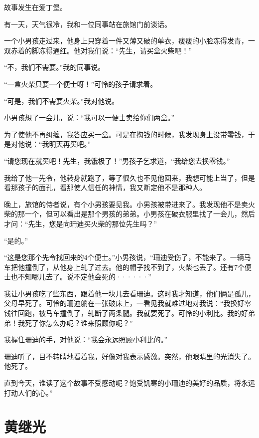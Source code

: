 \documentclass[12pt,UTF-8,openany]{ctexbook}
\begin{document}
\begin{large}
    
    故事发生在爱丁堡。
    
    有一天，天气很冷，我和一位同事站在旅馆门前谈话。
    
    一个小男孩走过来，他身上只穿着一件又薄又破的单衣，瘦瘦的小脸冻得发青，一双赤着的脚冻得通红。他对我们说：“先生，请买盒火柴吧！”
    
    “不，我们不需要。”我的同事说。
    
    “一盒火柴只要一个便士呀！”可怜的孩子请求着。
    
    “可是，我们不需要火柴。”我对他说。
    
    小男孩想了一会儿，说：“我可以一便士卖给你们两盒。”
    
    为了使他不再纠缠，我答应买一盒。可是在掏钱的时候，我发现身上没带零钱，于是对他说：“我明天再买吧。”
    
    “请您现在就买吧！先生，我饿极了！”男孩子乞求道，“我给您去换零钱。”
    
    我给了他一先令，他转身就跑了，等了很久也不见他回来，我想可能上当了，但是看那孩子的面孔，看那使人信任的神情，我又断定他不是那种人。
    
    晚上，旅馆的侍者说，有个小男孩要见我。小男孩被带进来了。我发现他不是卖火柴的那一个，但可以看出是那个男孩的弟弟。小男孩在破衣服里找了一会儿，然后才问：“先生，您是向珊迪买火柴的那位先生吗？”
    
    “是的。”
    
    “这是您那个先令找回来的4个便士。”小男孩说，“珊迪受伤了，不能来了。一辆马车把他撞倒了，从他身上轧了过去。他的帽子找不到了，火柴也丢了。还有7个便士也不知哪儿去了。说不定他会死的······”
    
    我让小男孩吃了些东西，跟着他一块儿去看珊迪。这时我才知道，他们俩是孤儿，父母早死了。可怜的珊迪躺在一张破床上，一看见我就难过地对我说：“我换好零钱往回跑，被马车撞倒了，轧断了两条腿。我就要死了。可怜的小利比。我的好弟弟！我死了你怎么办呢？谁来照顾你呢？”
    
    我握住珊迪的手，对他说：“我会永远照顾小利比的。”
    
    珊迪听了，目不转睛地看着我，好像对我表示感激。突然，他眼睛里的光消失了。他死了。
    
    直到今天，谁读了这个故事不受感动呢？饱受饥寒的小珊迪的美好的品质，将永远打动人们的心。”
    
\end{large}



\chapter{黄继光}
\end{document}
